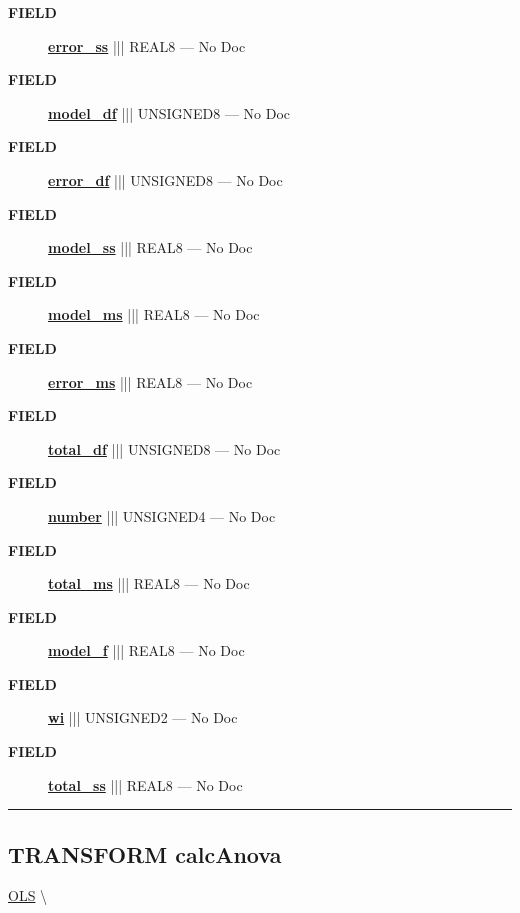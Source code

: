 \par
\begin{description}
\item [\colorbox{tagtype}{\color{white} \textbf{\textsf{FIELD}}}] \textbf{\underline{error\_ss}} ||| REAL8 --- No Doc
\item [\colorbox{tagtype}{\color{white} \textbf{\textsf{FIELD}}}] \textbf{\underline{model\_df}} ||| UNSIGNED8 --- No Doc
\item [\colorbox{tagtype}{\color{white} \textbf{\textsf{FIELD}}}] \textbf{\underline{error\_df}} ||| UNSIGNED8 --- No Doc
\item [\colorbox{tagtype}{\color{white} \textbf{\textsf{FIELD}}}] \textbf{\underline{model\_ss}} ||| REAL8 --- No Doc
\item [\colorbox{tagtype}{\color{white} \textbf{\textsf{FIELD}}}] \textbf{\underline{model\_ms}} ||| REAL8 --- No Doc
\item [\colorbox{tagtype}{\color{white} \textbf{\textsf{FIELD}}}] \textbf{\underline{error\_ms}} ||| REAL8 --- No Doc
\item [\colorbox{tagtype}{\color{white} \textbf{\textsf{FIELD}}}] \textbf{\underline{total\_df}} ||| UNSIGNED8 --- No Doc
\item [\colorbox{tagtype}{\color{white} \textbf{\textsf{FIELD}}}] \textbf{\underline{number}} ||| UNSIGNED4 --- No Doc
\item [\colorbox{tagtype}{\color{white} \textbf{\textsf{FIELD}}}] \textbf{\underline{total\_ms}} ||| REAL8 --- No Doc
\item [\colorbox{tagtype}{\color{white} \textbf{\textsf{FIELD}}}] \textbf{\underline{model\_f}} ||| REAL8 --- No Doc
\item [\colorbox{tagtype}{\color{white} \textbf{\textsf{FIELD}}}] \textbf{\underline{wi}} ||| UNSIGNED2 --- No Doc
\item [\colorbox{tagtype}{\color{white} \textbf{\textsf{FIELD}}}] \textbf{\underline{total\_ss}} ||| REAL8 --- No Doc
\end{description}





\rule{\linewidth}{0.5pt}
\subsection*{\textsf{\colorbox{headtoc}{\color{white} TRANSFORM}
calcAnova}}

\hypertarget{ecldoc:linearregression.ols.calcanova}{}
\hspace{0pt} \hyperlink{ecldoc:linearregression.ols}{OLS} \textbackslash 

